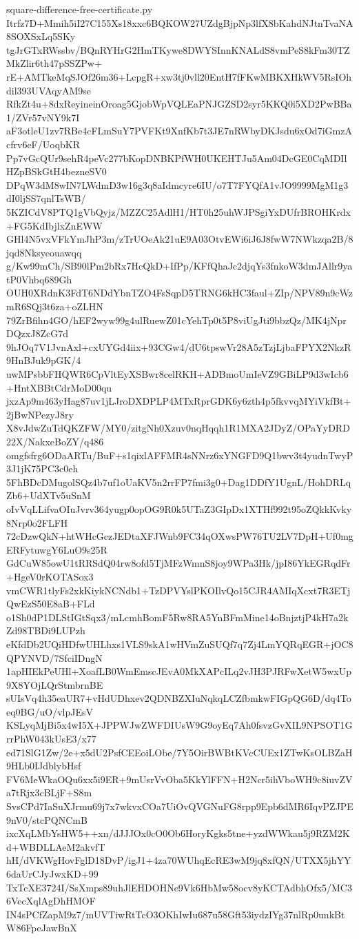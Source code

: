 \documentclass[11pt]{article}
\theoremstyle{definition}
\theoremstyle{remark}
\begin{document}
\begin{filecontents*}[overwrite]{square-difference-free-certificate.py}
Itrfz7D+Mmih5iI27C155Xs18xxc6BQKOW27UZdgBjpNp3lfX8bKahdNJtnTvaNA8SOXSxLq5SKy
tgJrGTxRWssbv/BQnRYHrG2HmTKywe8DWYSInnKNALdS8vmPeS8kFm30TZMkZlir6th47pSSZPw+
rE+AMTkeMqSJOf26m36+LcpgR+xw3tj0vll20EntH7fFKwMBKXHkWV5RsIOhdil393UVAqyAM9se
RfkZt4u+8dxReyineinOroag5GjobWpVQLEaPNJGZSD2syr5KKQ0i5XD2PwBBa1/ZVr57vNY9k7I
aF3otleU1zv7RBe4cFLmSuY7PVFKt9XnfKb7t3JE7nRWbyDKJsdu6xOd7iGmzAcfrv6eF/UoqbKR
Pp7vGcQUr9sehR4peVc277bKopDNBKPfWH0UKEHTJu5Am04DcGE0CqMDIlHZpBSkGtH4bezneSV0
DPqW3dM8wIN7LWdmD3w16g3q8aIdmcyre6IU/o7T7FYQfA1vJO9999MgM1g3dI0ljSS7qnlTsWB/
5KZICdV8PTQ1gVbQyjz/MZZC25AdlH1/HT0h25uhWJPSgiYxDUfrBROHKrdx+FG5KdIbjlxZnEWW
GHl4N5vxVFkYmJhP3m/zTrUOeAk21uE9A03OtvEWi6iJ6J8fwW7NWkzqa2B/8jqd8Nksyeouawqq
g/Kw99mCh/SB90lPm2bRx7HcQkD+IfPp/KFfQhaJc2djqYs3fnkoW3dmJAllr9yatP0Vhbq689Gh
OUH0XRdnK3FdT6NDdYbnTZO4FsSqpD5TRNG6kHC3faul+ZIp/NPV89n9cWzmR6SQj3t6za+oZLHN
79ZrBfihn4GO/hEF2wyw99g4ulRuewZ01cYehTp0t5P8viUgJti9bbzQz/MK4jNprDQzxJ8ZcG7d
9hJOq7V1JvnAxl+cxUYGd4iix+93CGw4/dU6tpswVr28A5zTzjLjbaFPYX2NkzR9HnBJuk9pGK/4
uwMPsbbFHQWR6CpVltEyXSBwr8celRKH+ADBmoUmIeVZ9GBiLP9d3wIcb6+HntXBBtCdrMoD00qu
jxzAp9m463yHag87uv1jLJroDXDPLP4MTxRprGDK6y6zth4p5fkvvqMYiVkfBt+2jBwNPezyJ8ry
X8vJdwZuTdQKZFW/MY0/zitgNh0Xzuv0nqHqqh1R1MXA2JDyZ/OPaYyDRD22X/NakxeBoZY/q486
omgfsfrg6ODaARTu/BuF+s1qixlAFFMR4sNNrz6xYNGFD9Q1bwv3t4yudnTwyP3J1jK75PC3c0eh
5FhBDcDMugolSQz4b7uf1oUaKV5n2rrFP7fmi3g0+Dag1DDfY1UgnL/HohDRLqZb6+UdXTv5uSnM
oIvVqLLifvaOIuJvrv364yugp0opOG9R0k5UTaZ3GIpDx1XTHf992t95oZQkkKvky8Nrp0o2FLFH
72cDzwQkN+htWHcGczJEDtaXFJWnb9FC34qOXwsPW76TU2LV7DpH+Uf0mgERFytuwgY6LuO9s25R
GdCuW85owU1tRRSdQ04rw8ofd5TjMFzWmnS8joy9WPa3Hk/jpI86YkEGRqdFr+HgeV0rKOTASox3
vmCWR1tlyFs2xkKiykNCNdb1+TzDPVYslPKOIlvQo15CJR4AMIqXcxt7R3ETjQwEzS50E8aB+FLd
o1Sh0dP1DLStIGtSqx3/mLcmhBomF5Rw8RA5YnBFmMine14oBnjztjP4kH7a2kZd98TBDi9LUPzh
eKfdDb2UQiHDfwUHLhxs1VLS9skA1wHVmZuSUQf7q7Zj4LmYQRqEGR+jOC8QPYNVD/7SfciIDngN
1apHIEkPeUHl+XoafLB0WmEmscJEvA0MkXAPcILq2vJH3PJRFwXetW5wxUp9X8YOjLQrStmbrnBE
sUIsVq4h35eaUR7+vHdUDhxev2QDNBZXIuNqkqLCZfbmkwFIGpQG6D/dq4Toeq0BG/uO/vlpJEsV
KSLyqMjBi5x4wI5X+JPPWJwZWFDIUsW9G9oyEq7Ah0fsvzGvXIL9NPSOT1GrrPhW043kUsE3/x77
ed71SlG1Zw/2e+x5dU2PsfCEEoiLObe/7Y5OirBWBtKVcCUEx1ZTwKsOLBZaH9HLb0IJdblybHsf
FV6MeWkaOQu6xx5i9ER+9mUsrVvOba5KkYlFFN+H2Ncr5ihVboWH9c8iuvZVa7tRjx3cBLjF+S8m
SvsCPd7IaSuXJrmu69j7x7wkvxCOa7UiOvQVGNuFG8rpp9Epb6dMR6IqvPZJPE9nV0/stcPQNCmB
ixcXqLMbYsHW5++xn/dJJJOx0cO0Ob6HoryKgks5tne+yzdWWkau5j9RZM2Kd+WBDLLAeM2akvfT
hH/dVKWgHovFglD18DvP/igJ1+4za70WUhqEcRE3wM9jq8xfQN/UTXX5jhYY6daUrCJyJwxKD+99
TxTcXE3724I/SsXmps89uhJlEHDOHNe9Vk6HbMw58ocv8yKCTAdbhOfx5/MC36VecXqlAgDhHMOF
IN4sPCfZapM9z7/mUVTiwRtTcO3OKhIwIu687u58Gft53iydzIYg37nlRp0unkBtW86FpeJawBnX

\end{filecontents*}
\end{document}
